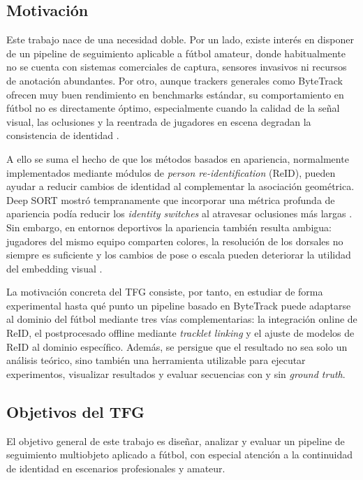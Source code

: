 \documentclass[../MAIN.tex]{subfiles}
\begin{document}
\subsection{Motivación}

Este trabajo nace de una necesidad doble. Por un lado, existe interés en disponer de un pipeline de seguimiento aplicable a fútbol amateur, donde habitualmente no se cuenta con sistemas comerciales de captura, sensores invasivos ni recursos de anotación abundantes. Por otro, aunque trackers generales como ByteTrack ofrecen muy buen rendimiento en benchmarks estándar, su comportamiento en fútbol no es directamente óptimo, especialmente cuando la calidad de la señal visual, las oclusiones y la reentrada de jugadores en escena degradan la consistencia de identidad \parencite{zhang2022bytetrack, cioppa2022soccernettracking}.

A ello se suma el hecho de que los métodos basados en apariencia, normalmente implementados mediante módulos de \textit{person re-identification} (ReID), pueden ayudar a reducir cambios de identidad al complementar la asociación geométrica. Deep SORT mostró tempranamente que incorporar una métrica profunda de apariencia podía reducir los \textit{identity switches} al atravesar oclusiones más largas \parencite{wojke2017deepsort}. Sin embargo, en entornos deportivos la apariencia también resulta ambigua: jugadores del mismo equipo comparten colores, la resolución de los dorsales no siempre es suficiente y los cambios de pose o escala pueden deteriorar la utilidad del embedding visual \parencite{cui2023sportsmot, cioppa2022soccernettracking}.

La motivación concreta del TFG consiste, por tanto, en estudiar de forma experimental hasta qué punto un pipeline basado en ByteTrack puede adaptarse al dominio del fútbol mediante tres vías complementarias: la integración online de ReID, el postprocesado offline mediante \textit{tracklet linking} y el ajuste de modelos de ReID al dominio específico. Además, se persigue que el resultado no sea solo un análisis teórico, sino también una herramienta utilizable para ejecutar experimentos, visualizar resultados y evaluar secuencias con y sin \textit{ground truth}.

\subsection{Objetivos del TFG}

El objetivo general de este trabajo es diseñar, analizar y evaluar un pipeline de seguimiento multiobjeto aplicado a fútbol, con especial atención a la continuidad de identidad en escenarios profesionales y amateur.
\end{document}
